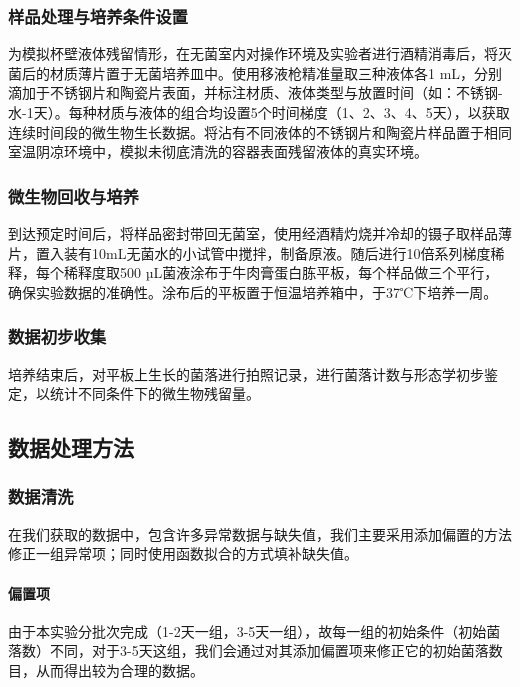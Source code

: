 \documentclass[12pt,a4paper]{ctexart}
\begin{document}
\subsubsection{样品处理与培养条件设置}

为模拟杯壁液体残留情形，在无菌室内对操作环境及实验者进行酒精消毒后，将灭菌后的材质薄片置于无菌培养皿中。使用移液枪精准量取三种液体各1 mL，分别滴加于不锈钢片和陶瓷片表面，并标注材质、液体类型与放置时间\cite{ZSTJ202405006}（如：不锈钢-水-1天）。每种材质与液体的组合均设置5个时间梯度（1、2、3、4、5天），以获取连续时间段的微生物生长数据。将沾有不同液体的不锈钢片和陶瓷片样品置于相同室温阴凉环境中，模拟未彻底清洗的容器表面残留液体的真实环境。

\subsubsection{微生物回收与培养}

到达预定时间后，将样品密封带回无菌室，使用经酒精灼烧并冷却的镊子取样品薄片，置入装有10mL无菌水的小试管中搅拌，制备原液。随后进行10倍系列梯度稀释，每个稀释度取500 µL菌液涂布于牛肉膏蛋白胨平板，每个样品做三个平行，确保实验数据的准确性。涂布后的平板置于恒温培养箱中，于37℃下培养一周。

\subsubsection{数据初步收集}

培养结束后，对平板上生长的菌落进行拍照记录，进行菌落计数与形态学初步鉴定，以统计不同条件下的微生物残留量。\cite{SPKX198605015}

\subsection{数据处理方法}

\subsubsection{数据清洗}
在我们获取的数据中，包含许多异常数据与缺失值，我们主要采用添加偏置的方法修正一组异常项；同时使用函数拟合的方式填补缺失值。
\paragraph{偏置项}
由于本实验分批次完成（1-2天一组，3-5天一组），故每一组的初始条件（初始菌落数）不同，对于3-5天这组，我们会通过对其添加偏置项来修正它的初始菌落数目，从而得出较为合理的数据。
\end{document}
